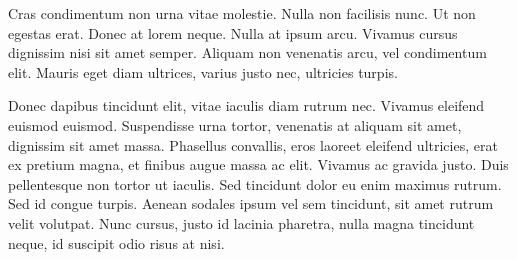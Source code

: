 \documentclass[11pt, a4paper]{resources/JTH}
\begin{document}
Cras condimentum non urna vitae molestie. Nulla non facilisis nunc. Ut non egestas erat. Donec at lorem neque. Nulla at ipsum arcu. Vivamus cursus dignissim nisi sit amet semper. Aliquam non venenatis arcu, vel condimentum elit. Mauris eget diam ultrices, varius justo nec, ultricies turpis.

Donec dapibus tincidunt elit, vitae iaculis diam rutrum nec. Vivamus eleifend euismod euismod. Suspendisse urna tortor, venenatis at aliquam sit amet, dignissim sit amet massa. Phasellus convallis, eros laoreet eleifend ultricies, erat ex pretium magna, et finibus augue massa ac elit. Vivamus ac gravida justo. Duis pellentesque non tortor ut iaculis. Sed tincidunt dolor eu enim maximus rutrum. Sed id congue turpis. Aenean sodales ipsum vel sem tincidunt, sit amet rutrum velit volutpat. Nunc cursus, justo id lacinia pharetra, nulla magna tincidunt neque, id suscipit odio risus at nisi.
\end{document}
